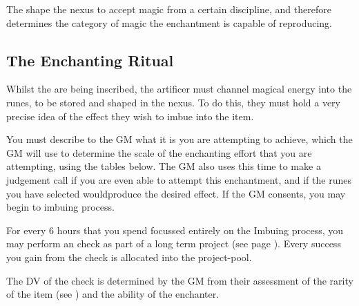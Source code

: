{
	The  shape the nexus to accept magic from a certain discipline, and therefore determines the category of magic the enchantment is capable of reproducing.
}
{
	
	
	
	
	
	
	
	
	
	
	
	
	
} 



\subsection{The Enchanting Ritual}

Whilst the  are being inscribed, the artificer must channel magical energy into the runes, to be stored and shaped in the nexus. To do this, they must hold a very precise idea of the effect they wish to imbue into the item. 

You must describe to the GM what it is you are attempting to achieve, which the GM will use to determine the scale of the enchanting effort that you are attempting, using the tables below. The GM also uses this time to make a judgement call if you are even able to attempt this enchantment, and if the runes you have selected wouldproduce the desired effect. If the GM consents, you may begin to imbuing process. 

For every 6 hours that you spend focussed entirely on the Imbuing process, you may perform an  check as part of a long term project (see page \pageref{S:Extended}). Every success you gain from the check is allocated into the project-pool. 

The DV of the check is determined by the GM from their assessment of the rarity of the item (see \pageref{S:ItemRarity}) and the  ability of the enchanter. 

